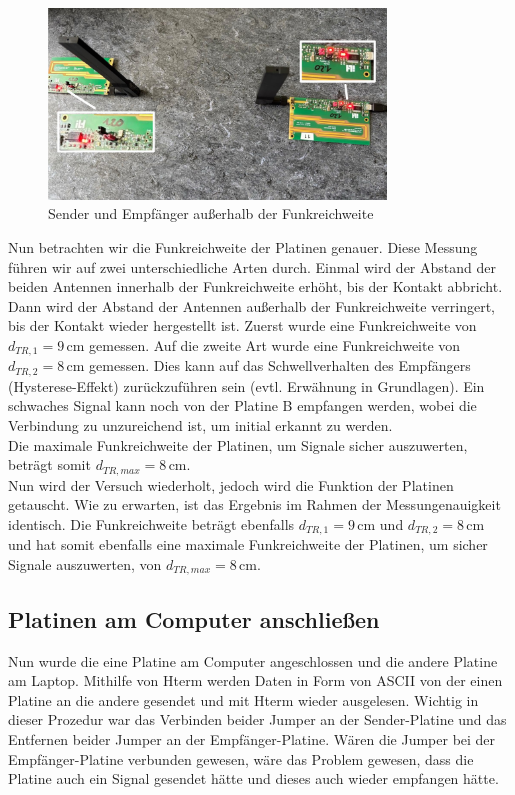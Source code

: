 \begin{figure}[H]
    \centering
    \includegraphics[width=0.8\textwidth]{Pictures/Task2a.jpg}
    \caption{Sender und Empfänger außerhalb der Funkreichweite}
    \label{fig:Task2a}
\end{figure}
Nun betrachten wir die Funkreichweite der Platinen genauer. Diese Messung führen wir auf zwei unterschiedliche
Arten durch. Einmal wird der Abstand der beiden Antennen innerhalb der Funkreichweite erhöht, bis der Kontakt
abbricht. Dann wird der Abstand der Antennen außerhalb der Funkreichweite verringert, bis der Kontakt wieder
hergestellt ist. Zuerst wurde eine Funkreichweite von $d_{TR,1}=9\,\text{cm}$ gemessen. Auf die zweite Art wurde eine
Funkreichweite von $d_{TR,2}=8\,\text{cm}$ gemessen. Dies kann auf das Schwellverhalten des Empfängers (Hysterese-Effekt)
zurückzuführen sein (evtl. Erwähnung in Grundlagen). 
Ein schwaches Signal kann noch von der Platine B empfangen werden, wobei die Verbindung zu unzureichend ist, um 
initial erkannt zu werden.\\
Die maximale Funkreichweite der Platinen, um Signale sicher auszuwerten, beträgt somit $d_{TR,max}=8\,\text{cm}$.
\\
Nun wird der Versuch wiederholt, jedoch wird die Funktion der Platinen getauscht. Wie zu erwarten, ist das Ergebnis
im Rahmen der Messungenauigkeit identisch. Die Funkreichweite beträgt ebenfalls $d_{TR,1}=9\,\text{cm}$ und $d_{TR,2}=8\,\text{cm}$ und 
hat somit ebenfalls eine maximale Funkreichweite der Platinen, um sicher Signale auszuwerten, von $d_{TR,max}=8\,\text{cm}$.

\subsection{Platinen am Computer anschließen}
Nun wurde die eine Platine am Computer angeschlossen und die andere Platine am Laptop.
Mithilfe von Hterm werden Daten in Form von ASCII von der einen Platine an die andere gesendet
und mit Hterm wieder ausgelesen.
Wichtig in dieser Prozedur war das Verbinden beider Jumper an der Sender-Platine und das Entfernen beider
Jumper an der Empfänger-Platine. 
Wären die Jumper bei der Empfänger-Platine verbunden gewesen, wäre das Problem gewesen, dass die Platine auch 
ein Signal gesendet hätte und dieses auch wieder empfangen hätte.

